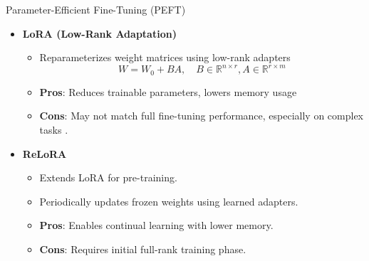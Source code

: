 \documentclass{beamer}
\begin{document}
\begin{frame}{Parameter-Efficient Fine-Tuning (PEFT)}
    \begin{itemize}
        \item \textbf{LoRA (Low-Rank Adaptation)} \citep{huLoRALowRankAdaptation2021}
            \begin{itemize}
                \item Reparameterizes weight matrices using low-rank adapters
                \begin{equation}
                    W = W_0 + BA, \quad B \in \mathbb{R}^{n \times r}, A \in \mathbb{R}^{r \times m}
                \end{equation}
                \item \textbf{Pros}: Reduces trainable parameters, lowers memory usage
                \item \textbf{Cons}: May not match full fine-tuning performance, especially on complex tasks \citep{xiaChainLoRAEfficient2024}.
            \end{itemize}
        \item \textbf{ReLoRA} \citep{lialinReLoRAHighRankTraining2023}
            \begin{itemize}
                \item Extends LoRA for pre-training.
                \item Periodically updates frozen weights using learned adapters.
                \item \textbf{Pros}: Enables continual learning with lower memory.
                \item \textbf{Cons}: Requires initial full-rank training phase.
            \end{itemize}
    \end{itemize}
\end{frame}
\end{document}
